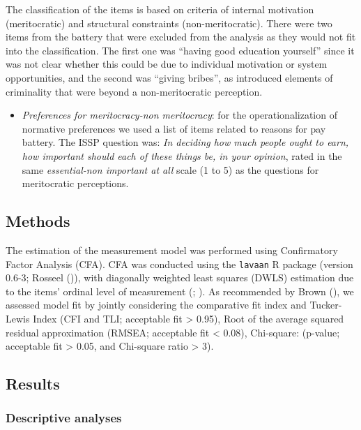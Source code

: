 \documentclass[
  10pt,
  a4paper,
]{article}
\providecommand{\tightlist}{%
  \setlength{\itemsep}{0pt}\setlength{\parskip}{0pt}}
\begin{document}
The classification of the items is based on criteria of internal motivation (meritocratic) and structural constraints (non-meritocratic). There were two items from the battery that were excluded from the analysis as they would not fit into the classification. The first one was ``having good education yourself'' since it was not clear whether this could be due to individual motivation or system opportunities, and the second was ``giving bribes'', as introduced elements of criminality that were beyond a non-meritocratic perception.

\begin{itemize}
\tightlist
\item
  \emph{Preferences for meritocracy-non meritocracy}: for the operationalization of normative preferences we used a list of items related to reasons for pay battery. The ISSP question was: \emph{In deciding how much people ought to earn, how important should each of these things be, in your opinion}, rated in the same \emph{essential-non important at all} scale (1 to 5) as the questions for meritocratic perceptions.
\end{itemize}

\subsection{Methods}\label{methods}

The estimation of the measurement model was performed using Confirmatory Factor Analysis (CFA). CFA was conducted using the \texttt{lavaan} R package (version 0.6-3; Rosseel ()), with diagonally weighted least squares (DWLS) estimation due to the items' ordinal level of measurement (; ). As recommended by Brown (), we assessed model fit by jointly considering the comparative fit index and Tucker-Lewis Index (CFI and TLI; acceptable fit \textgreater{} 0.95), Root of the average squared residual approximation (RMSEA; acceptable fit \textless{} 0.08), Chi-square: (p-value; acceptable fit \textgreater{} 0.05, and Chi-square ratio \textgreater{} 3).

\subsection{Results}\label{results}

\subsubsection{Descriptive analyses}\label{descriptive-analyses}
\end{document}
